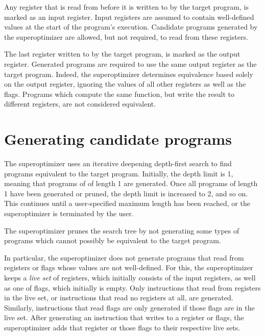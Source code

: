 \documentclass[a4paper,11pt]{kth-mag}
\begin{document}
Any register that is read from before it is written to by the target program, is marked as an input register.
Input registers are assumed to contain well-defined values at the start of the program's execution.
Candidate programs generated by the superoptimizer are allowed, but not required, to read from these registers.

The last register written to by the target program, is marked as the output register.
Generated programs are required to use the same output register as the target program.
Indeed, the superoptimizer determines equivalence based solely on the output register, ignoring the values of all other registers as well as the flags.
Programs which compute the same function, but write the result to different registers, are not considered equivalent.

\section{Generating candidate programs}

The superoptimizer uses an iterative deepening depth-first search to find programs equivalent to the target program.
Initially, the depth limit is 1, meaning that programs of of length 1 are generated.
Once all programs of length 1 have been generated or pruned, the depth limit is increased to 2, and so on.
This continues until a user-specified maximum length has been reached, or the superoptimizer is terminated by the user.


The superoptimizer prunes the search tree by not generating some types of programs which cannot possibly be equivalent to the target program.

In particular, the superoptimizer does not generate programs that read from registers or flags whose values are not well-defined. %
For this, the superoptimizer keeps a \emph{live set} of registers, which initially consists of the input registers, as well as one of flags, which initially is empty.
Only instructions that read from registers in the live set, or instructions that read no registers at all, are generated.
Similarly, instructions that read flags are only generated if those flags are in the live set.
After generating an instruction that writes to a register or flags, the superoptimizer adds that register or those flags to their respective live sets.
\end{document}
